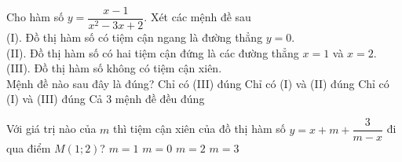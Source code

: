 

\begin{ex}%
	 Cho hàm số $y=\dfrac{x-1}{x^2-3x+2}$. Xét các mệnh đề sau\\
	(I). Đồ  thị hàm số có tiệm cận ngang là đường thẳng $y=0$.\\
	(II). Đồ thị hàm số có hai tiệm cận đứng là các đường thẳng $x=1$ và $x=2$.\\ 
	(III). Đồ thị hàm số  không có tiệm cận xiên.\\
	Mệnh đề  nào sau đây là đúng?
	 \choice
		{Chỉ có  (III) đúng}
		{Chỉ có (I) và (II)  đúng}
		{\True Chỉ có (I) và (III)  đúng}
		 {Cả 3 mệnh đề đều đúng}
\end{ex}

\begin{ex}%
	Với giá trị nào của $m$ thì tiệm cận xiên của đồ thị hàm số $y  = x + m + \dfrac{3}{m-x}$ đi qua điểm $M(1;2)$?
	 \choice
		{\True  $m=1$}
		{$m=0$} 
		{$m=2$} 
		 {$m=3$}
\end{ex}



